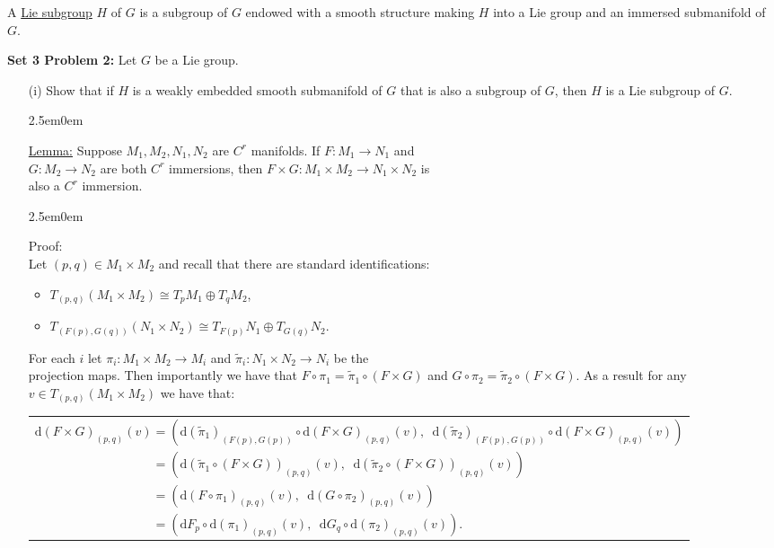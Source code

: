\documentclass{book}
\newcommand{\Hstatement}{%
   \color{MidnightBlue!90!Black}%
   \fontsize{12}{13}\selectfont%
}
\newcommand{\HexOne}{%
   \color{Purple}%
   \fontsize{12}{13}\selectfont%
}
\newcommand{\HexTwoP}{%
   \color{RedViolet}%
   \fontsize{12}{13}\selectfont%
}
\newenvironment{myIndent}{%
   \begin{adjustwidth}{2.5em}{0em}%
}{%
   \end{adjustwidth}%
}
\newcommand{\udefine}[1]{{%
   \setulcolor{Red}%
   \setul{0.14em}{0.07em}%
   \ul{#1}%
}}
\newcommand{\blab}[1]{\textbf{#1}}
\newcommand{\df}{\mathrm{d}}
\newcommand{\retTwo}{\hfill\bigbreak}
\begin{document}
A \udefine{Lie subgroup} $H$ of $G$ is a subgroup of $G$ endowed with a smooth structure making $H$ into a Lie group and an immersed submanifold of $G$.\retTwo

\Hstatement\blab{Set 3 Problem 2:} Let $G$ be a Lie group.
\begin{enumerate}
	\item[(i)] Show that if $H$ is a weakly embedded smooth submanifold of $G$ that is also a subgroup of $G$, then $H$ is a Lie subgroup of $G$.
	\begin{myIndent}\HexOne
		\ul{Lemma:} Suppose $M_1, M_2, N_1, N_2$ are $C^r$ manifolds. If $F: M_1 \to N_1$ and\\ $G: M_2 \to N_2$ are both $C^r$ immersions, then $F \times G: M_1 \times M_2 \to N_1 \times N_2$ is\\ also a $C^r$ immersion.
		\begin{myIndent}\HexTwoP
			Proof:\\
			Let $(p, q) \in M_1 \times M_2$ and recall that there are standard identifications:
			\begin{itemize}
				\item $T_{(p, q)} (M_1 \times M_2) \cong T_p M_1 \oplus T_q M_2$,
				\item $T_{(F(p), G(q))} (N_1 \times N_2) \cong T_{F(p)} N_1 \oplus T_{G(q)} N_2$.\retTwo
			\end{itemize}

			For each $i$ let $\pi_i : M_1 \times M_2 \to M_i$ and $\widetilde{\pi}_{i} : N_1 \times N_2 \to N_i$ be the\\ projection maps. Then importantly we have that $F \circ \pi_1 = \widetilde{\pi}_1 \circ (F \times G)$ and $G \circ \pi_2 = \widetilde{\pi}_2 \circ (F \times G)$. As a result for any $v \in T_{(p, q)} (M_1 \times M_2)$ we have that:\\ [-6pt]

			\hspace{-6em}\begin{tabular}{l}
				$\df (F \times G)_{(p, q)}(v) = \left(\df(\widetilde{\pi}_1)_{(F(p), G(p))} \circ \df (F \times G)_{(p, q)}(v), \phantom{a}\df(\widetilde{\pi}_2)_{(F(p), G(p))} \circ \df (F \times G)_{(p, q)}(v)\right)$\\ [6pt]
				$\phantom{\df (F \times G)_{(p, q)}(v)} = \left(\df(\widetilde{\pi}_1 \circ (F \times G))_{(p, q)}(v), \phantom{a}\df(\widetilde{\pi}_2 \circ (F \times G))_{(p, q)}(v)\right)$\\ [6pt]
				$\phantom{\df (F \times G)_{(p, q)}(v)} = \left(\df(F \circ \pi_1)_{(p, q)}(v), \phantom{a}\df(G \circ \pi_2)_{(p, q)}(v)\right)$\\ [6pt]
				$\phantom{\df (F \times G)_{(p, q)}(v)} = \left(\df F_p \circ \df (\pi_1)_{(p, q)}(v), \phantom{a}\df G_q \circ \df (\pi_2)_{(p, q)}(v)\right)$.
			\end{tabular}\newpage


\end{myIndent}
\end{myIndent}
\end{enumerate}
\end{document}
